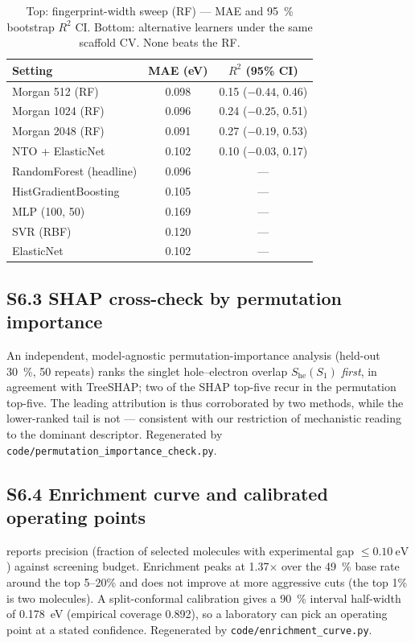\documentclass[twoside,twocolumn,9pt]{extarticle}
\begin{document}
\begin{table}[htbp]
  \centering
  \caption{Top: fingerprint-width sweep (RF) — MAE and \qty{95}{\percent} bootstrap $R^2$
    CI. Bottom: alternative learners under the same scaffold CV. None beats the RF.}
  \label{tab:capacity}
  \footnotesize
  \begin{tabular}{lcc}
    \toprule
    Setting & MAE (eV) & $R^2$ (95\% CI) \\
    \midrule
    Morgan 512 (RF)   & 0.098 & 0.15 ($-0.44$, 0.46) \\
    Morgan 1024 (RF)  & 0.096 & 0.24 ($-0.25$, 0.51) \\
    Morgan 2048 (RF)  & 0.091 & 0.27 ($-0.19$, 0.53) \\
    NTO + ElasticNet  & 0.102 & 0.10 ($-0.03$, 0.17) \\
    \midrule
    RandomForest (headline) & 0.096 & --- \\
    HistGradientBoosting    & 0.105 & --- \\
    MLP (100, 50)           & 0.169 & --- \\
    SVR (RBF)               & 0.120 & --- \\
    ElasticNet              & 0.102 & --- \\
    \bottomrule
  \end{tabular}
\end{table}

\subsection*{S6.3 SHAP cross-check by permutation importance}
An independent, model-agnostic permutation-importance analysis (held-out \qty{30}{\percent},
\num{50} repeats) ranks the singlet hole--electron overlap $S_\text{he}(S_1)$ \emph{first},
in agreement with TreeSHAP; two of the SHAP top-five recur in the permutation top-five. The
leading attribution is thus corroborated by two methods, while the lower-ranked tail is not
--- consistent with our restriction of mechanistic reading to the dominant descriptor.
Regenerated by \texttt{code/permutation\_importance\_check.py}.

\subsection*{S6.4 Enrichment curve and calibrated operating points}
 reports precision (fraction of selected molecules with experimental
gap $\le\qty{0.10}{\electronvolt}$) against screening budget. Enrichment peaks at
\num{1.37}$\times$ over the \qty{49}{\percent} base rate around the top \num{5}--\num{20}\%
and does not improve at more aggressive cuts (the top \num{1}\% is two molecules). A
split-conformal calibration gives a \qty{90}{\percent} interval half-width of
\qty{0.178}{\electronvolt} (empirical coverage \num{0.892}), so a laboratory can pick an
operating point at a stated confidence. Regenerated by \texttt{code/enrichment\_curve.py}.
\end{document}
